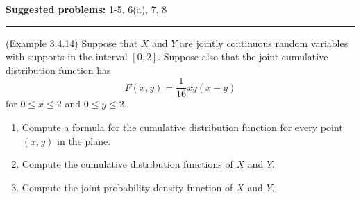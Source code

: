 \documentclass[12pt,reqno]{amsart}
\begin{document}
\textbf{Suggested problems:} 1-5, 6(a), 7, 8

\bigskip
\hrule

\bigskip
\prob (Example 3.4.14) Suppose that $X$ and $Y$ are jointly continuous random variables with supports in the interval $[0,2]$. Suppose also that the joint cumulative distribution function has
	\[
	F(x,y) = \frac{1}{16}xy(x+y)
	\]
for $0 \leq x \leq 2$ and $0 \leq y \leq 2$.

\medskip
\begin{enumerate}
\item Compute a formula for the cumulative distribution function for every point $(x,y)$ in the plane.\vfill
\item Compute the cumulative distribution functions of $X$ and $Y$.\vfill
\item Compute the joint probability density function of $X$ and $Y$.\vfill
\end{enumerate}
\end{document}
